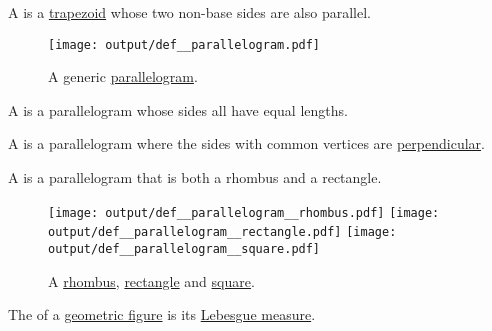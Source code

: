 \begin{definition}\label{def:parallelogram}
  A  is a \hyperref[def:trapezoid]{trapezoid} whose two non-base sides are also parallel.

  \begin{figure}[!ht]
    \centering
    \texttt{[image: output/def\_\_parallelogram.pdf]}
    \caption{A generic \hyperref[def:parallelogram]{parallelogram}.}\label{fig:def:parallelogram}
  \end{figure}

  \begin{thmenum}
     A  is a parallelogram whose sides all have equal lengths.

     A  is a parallelogram where the sides with common vertices are \hyperref[def:perpendicularity]{perpendicular}.

     A  is a parallelogram that is both a rhombus and a rectangle.

    \begin{figure}[!ht]
      \hfill
      \texttt{[image: output/def\_\_parallelogram\_\_rhombus.pdf]}
      \hfill
      \hfill
      \texttt{[image: output/def\_\_parallelogram\_\_rectangle.pdf]}
      \hfill
      \hfill
      \texttt{[image: output/def\_\_parallelogram\_\_square.pdf]}
      \hfill
      \hfill
      \caption{A \hyperref[def:parallelogram/rhombus]{rhombus}, \hyperref[def:parallelogram/rectangle]{rectangle} and \hyperref[def:parallelogram/square]{square}.}\label{fig:def:parallelogram/rhombus}
    \end{figure}
  \end{thmenum}
\end{definition}

\begin{definition}\label{def:figure_area}\mimprovised
  The  of a \hyperref[rem:geometric_shape]{geometric figure} is its \hyperref[def:lebesgue_measure]{Lebesgue measure}.
\end{definition}

